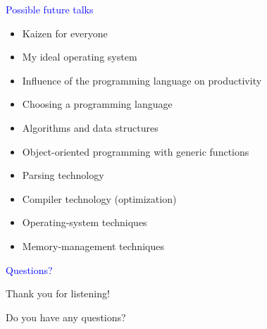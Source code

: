 \documentclass{slides}
\newcommand{\ti}[1]{\begin{center}\Large{\textcolor{blue}{#1}}\end{center}}
\begin{document}
\begin{slide}\ti{Possible future talks}

{\small
  \begin{itemize}
  \item Kaizen for everyone
  \item My ideal operating system
  \item Influence of the programming language on productivity
  \item Choosing a programming language
  \item Algorithms and data structures
  \item Object-oriented programming with generic functions
  \item Parsing technology
  \item Compiler technology (optimization)
  \item Operating-system techniques
  \item Memory-management techniques
  \end{itemize}}

\vfill\end{slide}
\begin{slide}\ti{Questions?}

Thank you for listening!

Do you have any questions?

\vfill\end{slide}



\end{document}
